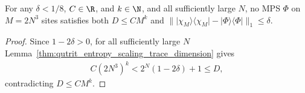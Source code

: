 \begin{theorem}
    \label{thm:qutrit_entropy_scaling_no_polynomial}
    \leanok
    For any $\delta<1/8$, $C\in\R$, and $k\in\N$, and all sufficiently large
    $N$, no MPS $\Phi$ on $M=2N^3$ sites satisfies both $D\le CM^k$ and
    $\|\lvert\chi_M\rangle\langle\chi_M\rvert-\lvert\Phi\rangle\langle\Phi\rvert\|_1\le\delta$.
\end{theorem}
\begin{proof}\leanok
    Since $1-2\delta>0$, for all sufficiently large $N$
    Lemma~\ref{thm:qutrit_entropy_scaling_trace_dimension} gives
    \begin{align}
        \label{eq:qutrit_entropy_scaling_polynomial_contradiction}
        C(2N^3)^k<2^N(1-2\delta)+1\le D,
    \end{align}
    contradicting $D\le CM^k$.
\end{proof}
